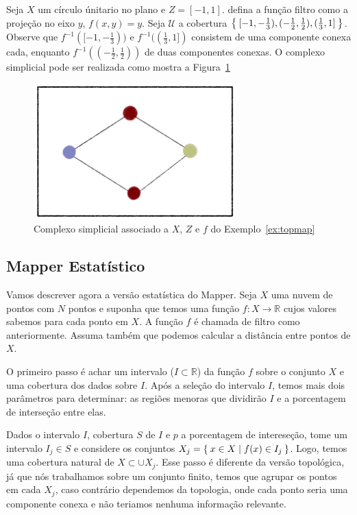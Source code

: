 \begin{ex}\label{ex:topmap}
    Seja $X$ um círculo únitario no plano e $Z=[-1,1]$. defina a função filtro como
    a projeção no eixo $y$, $f(x,y) = y$. Seja $\mathcal{U}$ a cobertura $\Set{[-1,-\frac{1}{3}), 
    (-\frac{1}{2},\frac{1}{2}), (\frac{1}{3}, 1]}$. Observe que $f^{-1}([-1,-\frac{1}{3}))$
    e $f^{-1}((\frac{1}{3}, 1])$  consistem de uma componente conexa cada, enquanto 
    $f^{-1}((-\frac{1}{2}, \frac{1}{2}))$ de duas componentes conexas. O complexo simplicial pode
    ser realizada como mostra a Figura~\ref{fig:topmap}
    \begin{figure}
        \centering
        \includegraphics[width=0.7\textwidth]{images/topmap.png}
        \caption{Complexo simplicial associado a $X$, $Z$ e $f$ 
                 do Exemplo~\ref{ex:topmap}}
        \label{fig:topmap}
        \fautor
    \end{figure}
\end{ex}

\subsection{Mapper Estatístico} 

Vamos descrever agora a versão estatística do Mapper. Seja $X$ uma nuvem de pontos com $N$ pontos
e suponha que temos uma função $f \colon X \to \mathbb{R}$ cujos valores sabemos para cada ponto
em $X$. A função $f$ é chamada de filtro como anteriormente. Assuma também que podemos calcular a 
distância entre pontos de $X$. 

O primeiro passo é achar um intervalo ($I \subset \mathbb{R}$) da função $f$ sobre o conjunto
$X$ e uma cobertura dos dados sobre $I$. Após a seleção do intervalo $I$, temos mais dois parâmetros 
para determinar: as regiões menoras que dividirão $I$ e a porcentagem de interseção entre elas. 

Dados o intervalo $I$, cobertura $S$ de $I$ e $p$ a porcentagem de intereseção, tome um
intervalo $I_j \in S$ e considere os conjuntos $X_j = \Set{x \in X | f(x) \in I_j}$.
Logo, temos uma cobertura natural de $X \subset \cup X_j$. Esse passo é diferente da 
versão topológica, já que nós trabalhamos sobre um conjunto finito, temos que agrupar os pontos
em cada $X_j$, caso contrário dependemos da topologia, onde cada ponto seria uma componente conexa
e não teriamos nenhuma informação relevante. 

